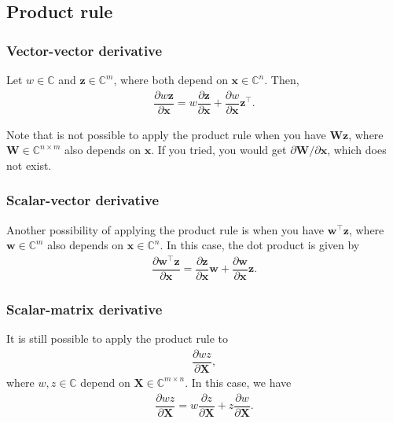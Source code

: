 \documentclass{article}
\newcommand{\trans}{\top}
\begin{document}
\subsection{Product rule}
\subsubsection{Vector-vector derivative}
Let \(w \in \mathbb{C}\) and \(\mathbf{z} \in \mathbb{C}^{m}\), where both depend on \(\mathbf{x} \in \mathbb{C}^{n}\). Then,
\begin{align}
    \dfrac{\partial w \mathbf{z}}{\partial \mathbf{x}} = w \dfrac{\partial \mathbf{z}}{\partial \mathbf{x}} + \dfrac{\partial w}{\partial \mathbf{x}} \mathbf{z}^\trans.
\end{align}

Note that is not possible to apply the product rule when you have \(\mathbf{Wz}\), where \(\mathbf{W} \in \mathbb{C}^{n \times m}\) also depends on \(\mathbf{x}\). If you tried, you would get \(\partial\mathbf{W}/\partial\mathbf{x}\), which does not exist.
\subsubsection{Scalar-vector derivative}
Another possibility of applying the product rule is when you have \(\mathbf{w}^{\trans} \mathbf{z}\), where \(\mathbf{w} \in \mathbb{C}^{m}\) also depends on \(\mathbf{x} \in \mathbb{C}^{n}\). In this case, the dot product is given by
\begin{align}
    \label{eq:scalar-vector-product-rule}
    \dfrac{\partial \mathbf{w}^{\trans} \mathbf{z}}{\partial \mathbf{x}} = \dfrac{\partial \mathbf{z}}{\partial \mathbf{x}} \mathbf{w} + \dfrac{\partial \mathbf{w}}{\partial \mathbf{x}} \mathbf{z}.
\end{align}

\subsubsection{Scalar-matrix derivative}
It is still possible to apply the product rule to
\begin{align}
    \dfrac{\partial wz}{\partial \mathbf{X}},
\end{align}
where \(w,z \in \mathbb{C}\) depend on \(\mathbf{X} \in \mathbb{C}^{m \times n}\). In this case, we have
\begin{align}
    \dfrac{\partial wz}{\partial \mathbf{X}} = w \dfrac{\partial z}{\partial \mathbf{X}} + z \dfrac{\partial w}{\partial \mathbf{X}}.
\end{align}
\end{document}
